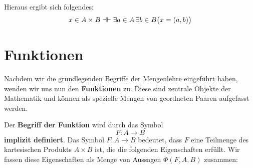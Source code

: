 \documentclass[main.tex]{subfiles}
\begin{document}
\begin{tabproof}
\end{tabproof}

\begin{remark}
    Hieraus ergibt sich folgendes:
\[
    x \in A \times B \dashv\vdash \exists a \in A\, \exists b \in B \big(x=(a,b)\big)
\]
\end{remark}

\begin{tabproof}
\end{tabproof}



\chapter{Funktionen}
Nachdem wir die grundlegenden Begriffe der Mengenlehre eingeführt haben, wenden wir uns nun den 
\textbf{Funktionen} zu. Diese sind zentrale Objekte der Mathematik und können als spezielle Mengen 
von geordneten Paaren aufgefasst werden.

\begin{definition}
Der \textbf{Begriff der Funktion} wird durch das Symbol
\[
F\colon A \to B
\]
\textbf{implizit definiert}. 
Das Symbol \(F\colon A\to B\) bedeutet, dass \(F\) eine Teilmenge des kartesischen Produkts \(A\times B\) ist,
die die folgenden Eigenschaften erfüllt. Wir fassen diese Eigenschaften als Menge von Aussagen 
\(\Phi(F,A,B)\) zusammen:
\end{definition}
\end{document}
